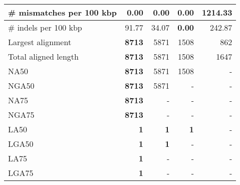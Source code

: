 \documentclass[12pt,a4paper]{article}
\begin{document}
\begin{table}[ht]
\begin{center}
\begin{tabular}{|l*{4}{|r}|}
\# mismatches per 100 kbp & {\bf 0.00} & {\bf 0.00} & {\bf 0.00} & 1214.33 \\ \hline
\# indels per 100 kbp & 91.77 & 34.07 & {\bf 0.00} & 242.87 \\ \hline
Largest alignment & {\bf 8713} & 5871 & 1508 & 862 \\ \hline
Total aligned length & {\bf 8713} & 5871 & 1508 & 1647 \\ \hline
NA50 & {\bf 8713} & 5871 & 1508 & - \\ \hline
NGA50 & {\bf 8713} & 5871 & - & - \\ \hline
NA75 & {\bf 8713} & - & - & - \\ \hline
NGA75 & {\bf 8713} & - & - & - \\ \hline
LA50 & {\bf 1} & {\bf 1} & {\bf 1} & - \\ \hline
LGA50 & {\bf 1} & {\bf 1} & - & - \\ \hline
LA75 & {\bf 1} & - & - & - \\ \hline
LGA75 & {\bf 1} & - & - & - \\ \hline
\end{tabular}
\end{center}
\end{table}
\end{document}
